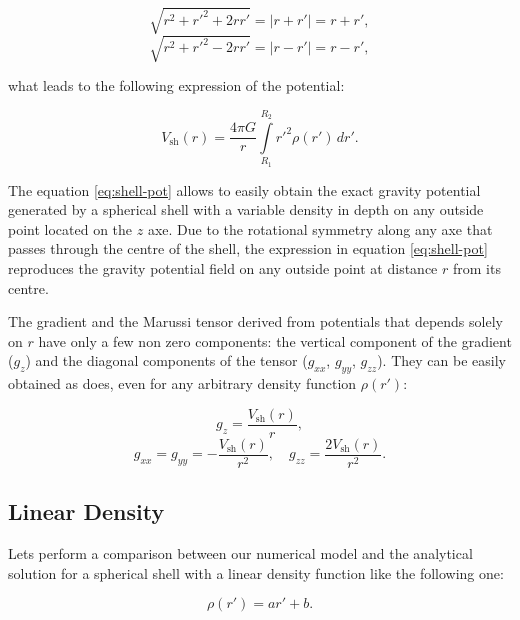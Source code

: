 \documentclass[extra]{gji}
\begin{document}
\begin{equation}
    \sqrt{r^2 + r'^2 + 2rr'} = |r + r'| = r + r',
\end{equation}
\begin{equation}
    \sqrt{r^2 + r'^2 - 2rr'} = |r - r'| = r - r',
\end{equation}

\noindent what leads to the following expression of the potential:

\begin{equation}
    V_\text{sh}(r) = \frac{4\pi G}{r}
    \int\limits_{R_1}^{R_2} {r'}^2 \rho(r') \, dr'.
\label{eq:shell-pot}
\end{equation}

The equation \ref{eq:shell-pot} allows to easily obtain the exact 
gravity potential generated by a spherical shell with a variable 
density in depth on any outside point located on the $z$ axe.
Due to the rotational symmetry along any axe that passes through the 
centre of the shell, the expression in equation \ref{eq:shell-pot} 
reproduces the gravity potential field on any outside point at distance 
$r$ from its centre.

The gradient and the Marussi tensor derived from potentials that 
depends solely on $r$ have only a few non zero components: the vertical 
component of the gradient ($g_z$) and the diagonal components of the 
tensor ($g_{xx}$, $g_{yy}$, $g_{zz}$).
They can be easily obtained as \citet{Grombein2013} does, even for any 
arbitrary density function $\rho(r')$:

\begin{equation}
    g_z = \frac{V_\text{sh}(r)}{r},
\end{equation}
\begin{equation}
    g_{xx} = g_{yy} = -\frac{V_\text{sh}(r)}{r^2}, \quad
    g_{zz} = \frac{2V_\text{sh}(r)}{r^2}.
\end{equation}


\subsection{Linear Density}

Lets perform a comparison between our numerical model and the 
analytical solution for a spherical shell with a linear density 
function like the following one:

\begin{equation}
    \rho(r') = ar' + b.
\end{equation}
\end{document}
